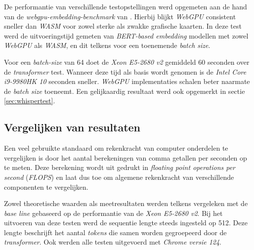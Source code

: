 De performantie van verschillende testopstellingen werd opgemeten aan de hand van de \textit{webgpu-embedding-benchmark} van \textcite{Lochner2024}. Hierbij blijkt \textit{WebGPU} consistent sneller dan \textit{WASM} voor zowel sterke als zwakke grafische kaarten. In deze test werd de uitvoeringstijd gemeten van \textit{BERT-based embedding} modellen met zowel \textit{WebGPU} als \textit{WASM}, en dit telkens voor een toenemende \textit{batch size}.

\bigbreak{}

Voor een \textit{batch-size} van 64 doet de \textit{Xeon E5-2680 v2} gemiddeld 60 seconden over de \textit{transformer} test. Wanneer deze tijd als basis wordt genomen is de \textit{Intel Core i9-9980HK 10} seconden sneller. \textit{WebGPU} implementaties schalen beter naarmate de \textit{batch size} toeneemt. Een gelijkaardig resultaat werd ook opgemerkt in sectie \ref{sec:whispertest}.

\subsection{Vergelijken van resultaten}

Een veel gebruikte standaard om rekenkracht van computer onderdelen te vergelijken is door het aantal berekeningen van comma getallen per seconden op te meten. Deze berekening wordt uit gedrukt in \emph{floating point operations per second} (\textit{FLOPS}) en laat dus toe om algemene rekenkracht van verschillende componenten te vergelijken. 

\bigbreak{}

Zowel theoretische waarden als meetresultaten werden telkens vergeleken met de \textit{base line} gebaseerd op de performantie van de \textit{Xeon E5-2680 v2}. Bij het uitvoeren van deze testen werd de sequentie lengte steeds ingesteld op 512. Deze lengte beschrijft het aantal \textit{tokens} die samen worden gegroepeerd door de \textit{transformer}. Ook werden alle testen uitgevoerd met \emph{Chrome versie 124}.

\break{}

